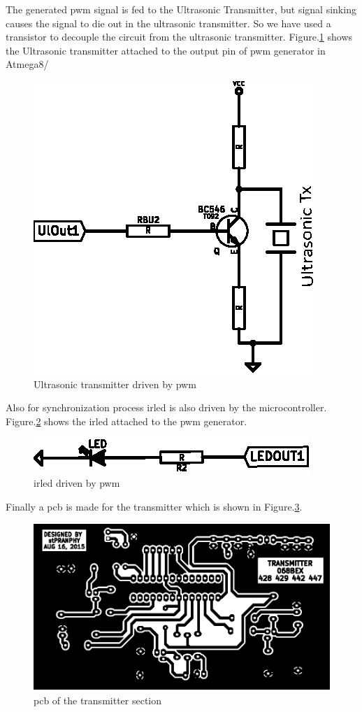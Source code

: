 The generated \gls{pwm} signal is fed to the Ultrasonic Transmitter, but signal sinking causes the signal to die out in the ultrasonic transmitter. So we have used a transistor to decouple the circuit from the ultrasonic transmitter. Figure.\ref{fig:Transmitter} shows the Ultrasonic transmitter attached to the output pin of \gls{pwm} generator in Atmega8/
\begin{figure}
	\centering
	\includegraphics{Images/Transmitter.eps}
	\caption{Ultrasonic transmitter driven by \gls{pwm}}
	\label{fig:Transmitter}
\end{figure}

Also for synchronization process \gls{irled} is also driven by the microcontroller. Figure.\ref{fig:IRLEDCircuit} shows the \gls{irled} attached to the \gls{pwm} generator.

\begin{figure}
	\centering
	\includegraphics{Images/IRLEDCircuit.eps}
	\caption{\gls{irled} driven by \gls{pwm}}
	\label{fig:IRLEDCircuit}
\end{figure}

Finally a \gls{pcb} is made for the transmitter which is shown in Figure.\ref{fig:TransmitterPCB}.

\begin{figure}
	\centering
	\includegraphics{Images/TransmitterPCB.eps}
	\caption{\gls{pcb} of the transmitter section}
	\label{fig:TransmitterPCB}
\end{figure}

